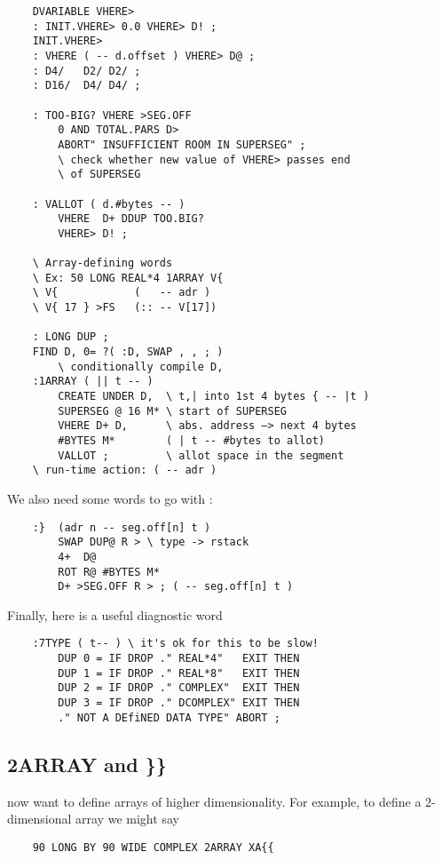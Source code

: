 {{\begin{lstlisting}
    DVARIABLE VHERE>
    : INIT.VHERE> 0.0 VHERE> D! ;
    INIT.VHERE>
    : VHERE ( -- d.offset ) VHERE> D@ ;
    : D4/   D2/ D2/ ;
    : D16/  D4/ D4/ ;

    : TOO-BIG? VHERE >SEG.OFF
        0 AND TOTAL.PARS D>
        ABORT" INSUFFICIENT ROOM IN SUPERSEG" ;
        \ check whether new value of VHERE> passes end
        \ of SUPERSEG

    : VALLOT ( d.#bytes -- )
        VHERE  D+ DDUP TOO.BIG?
        VHERE> D! ;

    \ Array-defining words
    \ Ex: 50 LONG REAL*4 1ARRAY V{
    \ V{            (   -- adr )
    \ V{ 17 } >FS   (:: -- V[17])

    : LONG DUP ;
    FIND D, 0= ?( :D, SWAP , , ; )
        \ conditionally compile D,
    :1ARRAY ( || t -- )
        CREATE UNDER D,  \ t,| into 1st 4 bytes { -- |t )
        SUPERSEG @ 16 M* \ start of SUPERSEG
        VHERE D+ D,      \ abs. address —> next 4 bytes
        #BYTES M*        ( | t -- #bytes to allot)
        VALLOT ;         \ allot space in the segment
    \ run-time action: ( -- adr )
\end{lstlisting}

We also need some words to go with :
\begin{lstlisting}
    :}  (adr n -- seg.off[n] t )
        SWAP DUP@ R > \ type -> rstack
        4+  D@
        ROT R@ #BYTES M*
        D+ >SEG.OFF R > ; ( -- seg.off[n] t )
\end{lstlisting}

Finally, here is a useful diagnostic word

\begin{lstlisting}
    :7TYPE ( t-- ) \ it's ok for this to be slow!
        DUP 0 = IF DROP ." REAL*4"   EXIT THEN
        DUP 1 = IF DROP ." REAL*8"   EXIT THEN
        DUP 2 = IF DROP ." COMPLEX"  EXIT THEN
        DUP 3 = IF DROP ." DCOMPLEX" EXIT THEN
        ." NOT A DEfiNED DATA TYPE" ABORT ;
\end{lstlisting}

\subsection{2ARRAY and \}\} }
 now want to define arrays of higher dimensionality. For example, to define a 2-dimensional array we might say

\begin{lstlisting}
    90 LONG BY 90 WIDE COMPLEX 2ARRAY XA{{
\end{lstlisting}

}}
